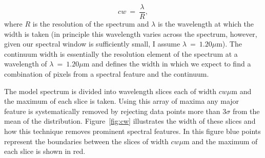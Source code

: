 \begin{equation}
    cw~=~\frac{\lambda}{R}, %
\end{equation}
\noindent where $R$ is the resolution of the spectrum and
$\lambda$ is the wavelength at which the width is taken
(in principle this wavelength varies across the spectrum, however, given our spectral window is sufficiently small, I assume $\lambda~=~1.20\mu$m).
The continuum width is essentially the resolution element of the spectrum at a wavelength of
$\lambda~=~1.20\mu$m and defines the width in which we expect to find a combination of pixels from a spectral feature and the continuum.


The model spectrum is divided into wavelength slices each of width $cw\mu$m and the maximum of each slice is taken.
Using this array of maxima any major feature is systematically removed by rejecting data points more than 3$\sigma$ from the mean of the distribution.
Figure~\ref{fig:cw} illustrates the width of these slices and how this technique  removes prominent spectral features.
In this figure blue points represent the boundaries between the slices of width $cw\mu$m and the maximum of each slice is shown in red.

